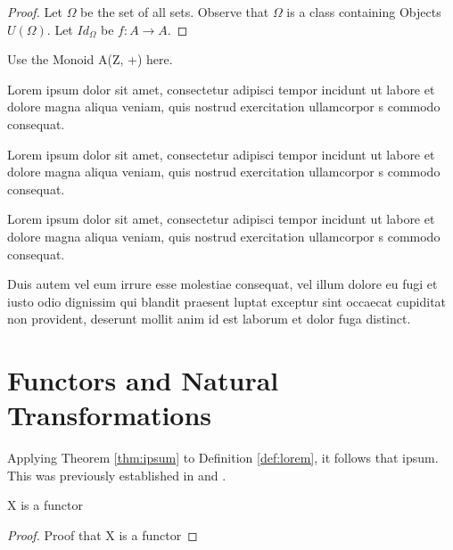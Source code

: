 \documentclass{article}
\begin{document}
\begin{proof}
Let $\Omega$ be the set of all sets. Observe that $\Omega$ is a class containing Objects $U(\Omega)$. Let $Id_{\Omega}$ be $f: A \to A$.
\end{proof}

\begin{example}
Use the Monoid A(Z, +) here.
\end{example}

Lorem ipsum dolor sit amet, consectetur adipisci tempor incidunt ut labore et dolore magna aliqua veniam, quis nostrud exercitation ullamcorpor s commodo consequat. 

\begin{definition}\label{def:lorem}
	Lorem ipsum dolor sit amet, consectetur adipisci tempor incidunt ut labore et dolore magna aliqua veniam, quis nostrud exercitation ullamcorpor s commodo consequat.
\end{definition}

Lorem ipsum dolor sit amet, consectetur adipisci tempor incidunt ut labore et dolore magna aliqua veniam, quis nostrud exercitation ullamcorpor s commodo consequat. 

\begin{theorem}\label{thm:ipsum}
	Duis autem vel eum irrure esse molestiae consequat, vel illum dolore eu fugi et iusto odio dignissim qui blandit praesent luptat exceptur sint occaecat cupiditat non provident, deserunt mollit anim id est laborum et dolor fuga distinct.
\end{theorem}



\section{Functors and Natural Transformations}

Applying Theorem \ref{thm:ipsum} to Definition \ref{def:lorem}, it follows that ipsum. This was previously established in \cite{Gauss86} and \cite{Euclid02,Euclid03}.

\begin{theorem}
X is a functor
\end{theorem}
\begin{proof}
Proof that X is a functor
\end{proof}





\end{document}
